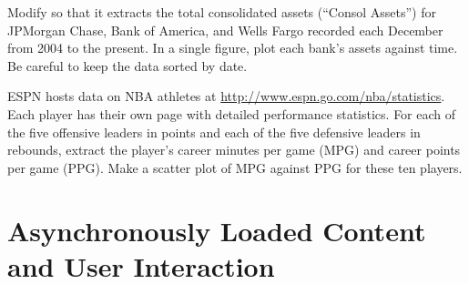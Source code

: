 
\begin{problem} %
Modify  so that it extracts the total consolidated assets (``Consol Assets'') for JPMorgan Chase, Bank of America, and Wells Fargo recorded each December from 2004 to the present.
In a single figure, plot each bank's assets against time.
Be careful to keep the data sorted by date.
\end{problem}

\begin{problem} %
ESPN hosts data on NBA athletes at \url{http://www.espn.go.com/nba/statistics}.
Each player has their own page with detailed performance statistics.
For each of the five offensive leaders in points and each of the five defensive leaders in rebounds, extract the player's career minutes per game (MPG) and career points per game (PPG).
Make a scatter plot of MPG against PPG for these ten players.
\end{problem}

\begin{comment} %
\begin{enumerate}
\item Load \url{http://www.google.com/finance} into BeautifulSoup.
Towards the bottom of the web page, there is a Sector summary.
Go through each sector and locate the top five Gainers.
In a SQL table, store the Name, abbreviation, \% Change, and Mkt Cap of the top Gainer for each Sector.

\item Load  into BeautifulSoup.
Go through the top five offensive leaders.
In a SQL table, store the name, career games played, career mins per game, career points per game, and career FG\% for each player.

\item Load \url{http://www.foxsports.com/soccer/united-states-women-team-stats} into BeautifulSoup.
Go though each player on the World Cup US women's team.
In a SQL table, store the name, hometown, position, and \# of games played in the World Cup.
\end{enumerate}
\end{comment}

\section*{Asynchronously Loaded Content and User Interaction} %


